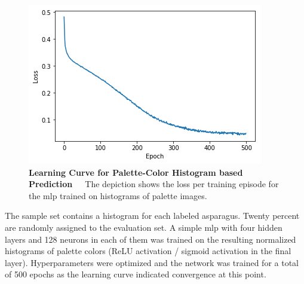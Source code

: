 \begin{table}[!h]
	\centering
	\caption[Feature Engineering Color-Histogram-Based Prediction]{\textbf{Feature Engineering Color-Histogram-Based Prediction}~~~Performance of color histogram-based predictions with a \acrshort{mlp}.}
	\label{tab:performance_color_feature_based}
\end{table} 

\begin{figure}[!htb]
	\centering
	\includegraphics[scale=0.7]{Figures/chapter04/fe_palette_color.png}
	\decoRule
	\caption[Feature Engineering Learning Curve for Palette-Color Histogram based Prediction]{\textbf{Learning Curve for Palette-Color Histogram based Prediction}~~~The depiction shows the loss per training episode for the \acrshort{mlp} trained on histograms of palette images.}
	\label{fig:FeatureEngineeringPaletteColor}
\end{figure}

The sample set contains a histogram for each labeled asparagus. Twenty percent are randomly assigned to the evaluation set. A simple \acrshort{mlp} with four hidden layers and 128 neurons in each of them was trained on the resulting normalized histograms of palette colors (ReLU activation / sigmoid activation in the final layer). Hyperparameters were optimized and the network was trained for a total of 500 epochs as the learning curve indicated convergence at this point.

